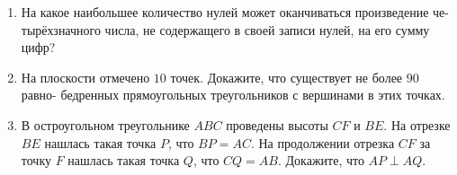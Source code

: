 \documentclass{article}
\begin{document}
\begin{enumerate}[label*=\protect\fbox{\arabic{enumi}}]
\item На какое наибольшее количество нулей может оканчиваться произведение че- тырёхзначного числа, не содержащего в своей записи нулей, на его сумму цифр?

\item На плоскости отмечено $10$ точек. Докажите, что существует не более $90$ равно- бедренных прямоугольных треугольников с вершинами в этих точках.

\item В остроугольном треугольнике $ABC$ проведены высоты $CF$ и $BE$. На отрезке $BE$ нашлась такая точка $P$, что $BP = AC$. На продолжении отрезка $CF$ за точку $F$ нашлась такая точка $Q$, что $CQ = AB$. Докажите, что $AP \perp AQ$.

\end{enumerate}
\end{document}
